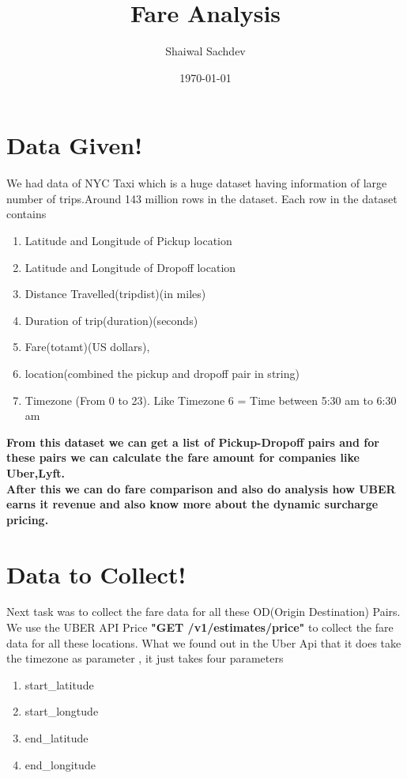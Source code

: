 \documentclass{article}
\title{\textbf {Fare Analysis}}
\author{Shaiwal Sachdev}
\date{\today}
\begin{document}
\maketitle

\section{Data Given!}

We had data of NYC Taxi which is a huge dataset having information of large number of trips.Around 143 million rows in the dataset. Each row in the dataset contains  
\begin{enumerate}
\item Latitude and Longitude of Pickup location
\item  Latitude and Longitude of Dropoff location
\item  Distance Travelled(tripdist)(in miles)
\item Duration of trip(duration)(seconds)
\item  Fare(totamt)(US dollars),
\item location(combined the pickup and dropoff pair in string)
\item Timezone (From 0 to 23). Like Timezone 6 = Time between 5:30 am to 6:30 am
\end{enumerate}
\textbf{From this dataset we can get a list of Pickup-Dropoff pairs and for these pairs we can calculate the fare amount for companies like Uber,Lyft.
\\After this we can do fare comparison and also do analysis how UBER earns it revenue and also know more about the dynamic surcharge pricing.}
\section{Data to Collect!}

Next task was to collect the fare data for all these OD(Origin Destination) Pairs.
We use the UBER API Price \textbf {"GET /v1/estimates/price"}  to collect the fare data for all these locations.
What we found out in the Uber Api that it does take the timezone as parameter , it just takes four parameters
\begin{enumerate}
\item start\_latitude
\item start\_longtude
\item end\_latitude
\item end\_longitude
\end{enumerate}
\end{document}

